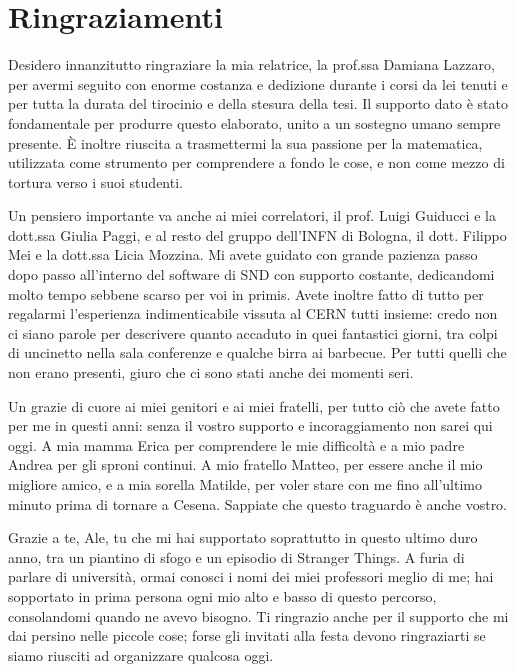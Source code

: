 \chapter*{Ringraziamenti}
\pagestyle{empty}
\thispagestyle{empty}

Desidero innanzitutto ringraziare la mia relatrice, la prof.ssa Damiana Lazzaro, per avermi seguito con enorme costanza e dedizione durante i corsi da lei tenuti e per tutta la durata del tirocinio e della stesura della tesi.
Il supporto dato è stato fondamentale per produrre questo elaborato, unito a un sostegno umano sempre presente.
È inoltre riuscita a trasmettermi la sua passione per la matematica, utilizzata come strumento per comprendere a fondo le cose, e non come mezzo di tortura verso i suoi studenti.

Un pensiero importante va anche ai miei correlatori, il prof. Luigi Guiducci e la dott.ssa Giulia Paggi, e al resto del gruppo dell'INFN di Bologna, il dott. Filippo Mei e la dott.ssa Licia Mozzina.
Mi avete guidato con grande pazienza passo dopo passo all'interno del software di SND con supporto costante, dedicandomi molto tempo sebbene scarso per voi in primis.
Avete inoltre fatto di tutto per regalarmi l'esperienza indimenticabile vissuta al CERN tutti insieme: credo non ci siano parole per descrivere quanto accaduto in quei fantastici giorni, tra colpi di uncinetto nella sala conferenze e qualche birra ai barbecue.
Per tutti quelli che non erano presenti, giuro che ci sono stati anche dei momenti seri.

Un grazie di cuore ai miei genitori e ai miei fratelli, per tutto ciò che avete fatto per me in questi anni: senza il vostro supporto e incoraggiamento non sarei qui oggi.
A mia mamma Erica per comprendere le mie difficoltà e a mio padre Andrea per gli sproni continui.
A mio fratello Matteo, per essere anche il mio migliore amico, e a mia sorella Matilde, per voler stare con me fino all'ultimo minuto prima di tornare a Cesena.
Sappiate che questo traguardo è anche vostro.

Grazie a te, Ale, tu che mi hai supportato soprattutto in questo ultimo duro anno, tra un piantino di sfogo e un episodio di Stranger Things.
A furia di parlare di università, ormai conosci i nomi dei miei professori meglio di me; hai sopportato in prima persona ogni mio alto e basso di questo percorso, consolandomi quando ne avevo bisogno.
Ti ringrazio anche per il supporto che mi dai persino nelle piccole cose; forse gli invitati alla festa devono ringraziarti se siamo riusciti ad organizzare qualcosa oggi.

